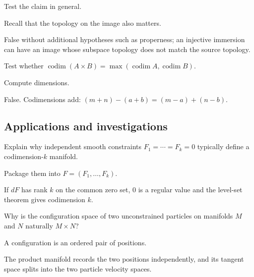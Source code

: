 \begin{exercise}\label{exr:vii06-ped-11}
Test the claim in general.
\end{exercise}
\begin{hint}
Recall that the topology on the image also matters.
\end{hint}
\begin{solution}
False without additional hypotheses such as properness; an injective immersion can have an image whose subspace topology does not match the source topology.
\end{solution}

\begin{exercise}\label{exr:vii06-ped-12}
Test whether \(\operatorname{codim}(A\times B)=\max(\operatorname{codim}A,\operatorname{codim}B)\).
\end{exercise}
\begin{hint}
Compute dimensions.
\end{hint}
\begin{solution}
False.  Codimensions add: \((m+n)-(a+b)=(m-a)+(n-b)\).
\end{solution}

\subsection*{Applications and investigations}

\begin{exercise}\label{exr:vii06-ped-13}
Explain why independent smooth constraints \(F_1=\cdots=F_k=0\) typically define a codimension-\(k\) manifold.
\end{exercise}
\begin{hint}
Package them into \(F=(F_1,\ldots,F_k)\).
\end{hint}
\begin{solution}
If \(dF\) has rank \(k\) on the common zero set, \(0\) is a regular value and the level-set theorem gives codimension \(k\).
\end{solution}

\begin{exercise}\label{exr:vii06-ped-14}
Why is the configuration space of two unconstrained particles on manifolds \(M\) and \(N\) naturally \(M\times N\)?
\end{exercise}
\begin{hint}
A configuration is an ordered pair of positions.
\end{hint}
\begin{solution}
The product manifold records the two positions independently, and its tangent space splits into the two particle velocity spaces.
\end{solution}

